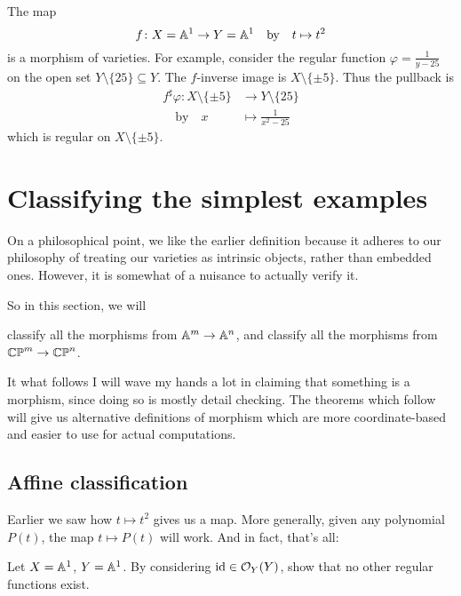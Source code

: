 \begin{example}
	The map
	\[ f \colon X = \mathbb A^1 \to Y = \mathbb A^1 \quad\text{by}\quad t \mapsto t^2 \]
	is a morphism of varieties.
	For example, consider the regular function $\varphi = \frac{1}{y-25}$ on
	the open set $Y \setminus \{25\} \subseteq Y$.
	The $f$-inverse image is $X \setminus \{\pm5\}$.
	Thus the pullback is
	\begin{align*}
		f^\sharp\varphi \colon X \setminus \{\pm5\} &\to Y \setminus \{25\} \\
		\quad\text{by}\quad x &\mapsto \frac{1}{x^2-25}
	\end{align*}
	which is regular on $X \setminus \{\pm5\}$.
\end{example}

\section{Classifying the simplest examples}

On a philosophical point, we like the earlier definition because
it adheres to our philosophy of treating our
varieties as intrinsic objects, rather than embedded ones.
However, it is somewhat of a nuisance to actually verify it.

So in this section, we will
\begin{itemize}
	\ii classify all the morphisms from $\mathbb A^m \to \mathbb A^n$, and
	\ii classify all the morphisms from $\mathbb{CP}^m \to \mathbb{CP}^n$.
\end{itemize}
It what follows I will wave my hands a lot in claiming
that something is a morphism, since doing so is mostly detail checking.
The theorems which follow will give us alternative definitions
of morphism which are more coordinate-based
and easier to use for actual computations.

\subsection{Affine classification}
Earlier we saw how $t \mapsto t^2$ gives us a map.
More generally, given any polynomial $P(t)$,
the map $t \mapsto P(t)$ will work.
And in fact, that's all:
\begin{exercise}
	Let $X = \mathbb A^1$, $Y = \mathbb A^1$.
	By considering $\mathrm{id} \in \mathcal O_Y(Y)$, show that no other
	regular functions exist.
\end{exercise}

